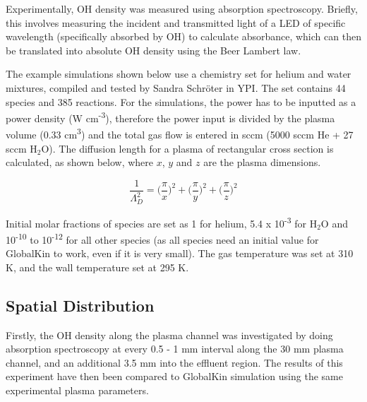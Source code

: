 \documentclass[11pt, oneside]{article}   	%
\begin{document}
Experimentally, OH density was measured using absorption spectroscopy.
Briefly, this involves measuring the incident and transmitted light of a LED of specific wavelength (specifically absorbed by OH) to calculate absorbance, which can then be translated into absolute OH density using the Beer Lambert law.

The example simulations shown below use a chemistry set for helium and water mixtures, compiled and tested by Sandra Schr\"oter in YPI.
The set contains 44 species and 385 reactions. %
For the simulations, the power has to be inputted as a power density (W cm\textsuperscript{-3}), therefore the power input is divided by the plasma volume (0.33 cm\textsuperscript{3}) and the total gas flow is entered in sccm (5000 sccm He + 27 sccm H$_2$O).
The diffusion length for a plasma of rectangular cross section is calculated, as shown below, where $x$, $y$ and $z$ are the plasma dimensions.

\begin{equation}
\frac{1}{\Lambda_D^2} = \Big(\frac{\pi}{x}\Big)^2 + \Big(\frac{\pi}{y}\Big)^2 + \Big(\frac{\pi}{z}\Big)^2
\end{equation}

Initial molar fractions of species are set as 1 for helium, 5.4 x 10\textsuperscript{-3} for H$_2$O and 10\textsuperscript{-10} to 10\textsuperscript{-12} for all other species (as all species need an initial value for GlobalKin to work, even if it is very small). 
The gas temperature was set at 310 K, and the wall temperature set at 295 K.


\subsection{Spatial Distribution}

Firstly, the OH density along the plasma channel was investigated by doing absorption spectroscopy at every 0.5 - 1 mm interval along the 30 mm plasma channel, and an additional 3.5 mm into the effluent region.
The results of this experiment have then been compared to GlobalKin simulation using the same experimental plasma parameters.
\end{document}
